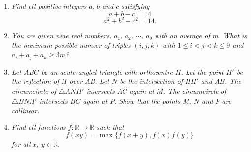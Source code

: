\documentclass{article}
\begin{document}
\begin{enumerate}[1.]
\item %
{\itshape Find all positive integers $a$, $b$ and $c$ satisfying 
$$a + b - c = 14$$
$$a^2 + b^2 - c^2 = 14.$$}


\item %
{\itshape You are given nine real numbers, $a_1$, $a_2$, $\cdots$, $a_9$ with an average of $m$. What is the minimum possible number of triples $(i, j, k)$ with $1 \le i < j < k \le 9$ and $a_i + a_j + a_k \ge 3m$?}


\item %
{\itshape Let $ABC$ be an acute-angled triangle with orthocentre $H$. Let the point $H'$ be the reflection of $H$ over $AB$. Let $N$ be the intersection of $HH'$ and $AB$. The circumcircle of $\triangle ANH'$ intersects $AC$ again at $M$. The circumcircle of $\triangle BNH'$ intersects $BC$ again at $P$. Show that the points $M$, $N$ and $P$ are collinear.}


\item %
{\itshape Find all functions $f: \mathbb{R} \rightarrow \mathbb{R}$ such that 
$$f(xy) = \max\{f(x + y), f(x)f(y)\} $$
for all $x$, $y \in \mathbb{R}$.}


\end{enumerate}
\end{document}
